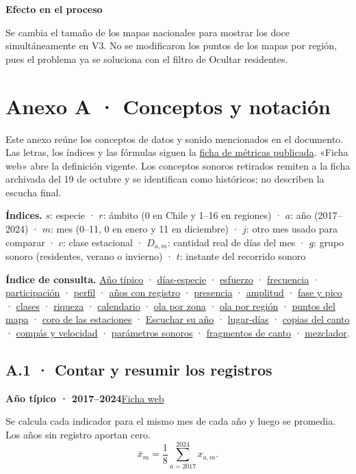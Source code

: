 \documentclass[11pt,a4paper]{article}
\newcommand{\Sitio}{https://canija2000.github.io/infovis_2026-2/}
\newcommand{\campo}[1]{\par\needspace{3\baselineskip}\textbf{#1}\par\nopagebreak}
\newcommand{\seccion}[1]{\clearpage\section*{#1}}
\DeclareRobustCommand{\concepto}[2]{\hyperlink{concepto:#1}{\textcolor{acento}{#2}}}
\newcommand{\defconcepto}[3]{\par\needspace{6\baselineskip}\hypertarget{concepto:#1}{}\textbf{#2}\hfill\href{\Sitio metricas.html\##3}{\textcolor{acento}{\footnotesize Ficha web}}\par\nopagebreak}
\begin{document}
\campo{Efecto en el proceso}
Se cambia el tamaño de los mapas nacionales para mostrar los doce simultáneamente en V3. No se modificaron los puntos de los mapas por región, pues el problema ya se soluciona con el filtro de Ocultar residentes. 

\seccion{Anexo A · Conceptos y notación}
\hypertarget{anexo:conceptos}{}
Este anexo reúne los conceptos de datos y sonido mencionados en el documento. Las letras, los índices y las fórmulas siguen la \href{\Sitio metricas.html}{\textcolor{acento}{ficha de métricas publicada}}. «Ficha web» abre la definición vigente. Los conceptos sonoros retirados remiten a la ficha archivada del 19 de octubre y se identifican como históricos; no describen la escucha final.

\textbf{Índices.}
$s$: especie · $r$: ámbito (0 en Chile y 1--16 en regiones) · $a$: año (2017--2024) · $m$: mes (0--11, 0 en enero y 11 en diciembre) · $j$: otro mes usado para comparar · $c$: clase estacional · $D_{a,m}$: cantidad real de días del mes · $g$: grupo sonoro (residentes, verano o invierno) · $t$: instante del recorrido sonoro

\textbf{Índice de consulta.}
\concepto{contexto}{Año típico} · \concepto{dias-especie}{días-especie} · \concepto{esfuerzo}{esfuerzo} · \concepto{frecuencia}{frecuencia} · \concepto{participacion}{participación} · \concepto{perfil}{perfil} · \concepto{anios-registro}{años con registro} · \concepto{presente}{presencia} · \concepto{amplitud}{amplitud} · \concepto{fase}{fase y pico} · \concepto{clases}{clases} · \concepto{riqueza}{riqueza} · \concepto{llegada}{calendario} · \concepto{ola-zonas}{ola por zona} · \concepto{ola-regiones}{ola por región} · \concepto{por-punto}{puntos del mapa} · \concepto{coro-estaciones}{coro de las estaciones} · \concepto{ano-especie}{Escuchar su año} · \concepto{lugar-dias}{lugar-días} · \concepto{copias}{copias del canto} · \concepto{tiempo-sonoro}{compás y velocidad} · \concepto{parametros-sonoros}{parámetros sonoros} · \concepto{calidad-audio}{fragmentos de canto} · \concepto{mezclador}{mezclador}.

\subsection*{A.1 · Contar y resumir los registros}

\defconcepto{contexto}{Año típico · 2017--2024}{contexto}
Se calcula cada indicador para el mismo mes de cada año y luego se promedia. Los años sin registro aportan cero.
\[
\bar{x}_m=\frac{1}{8}\sum_{a=2017}^{2024}x_{a,m}.
\]
\end{document}
